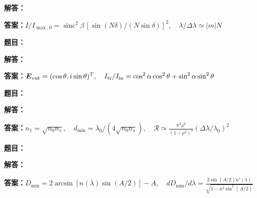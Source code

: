 \documentclass[lang=cn,color=blue,11pt]{elegantbook}
\begin{document}
\par\noindent\textbf{解答：}
\par\noindent\textbf{答案：}\(\displaystyle I/I_{\max,0}=\operatorname{sinc}^2\beta\,[\sin(N\delta)/(N\sin\delta)]^2,\quad \lambda/\Delta\lambda\simeq |m|N\)\par
\par\smallskip\noindent\hrulefill\par\medskip
{}\par
\noindent\textbf{题目：}
\par\noindent\textbf{解答：}
\par\noindent\textbf{答案：}\(\displaystyle \boldsymbol E_{\rm out}=(\cos\theta,i\sin\theta)^T,\quad I_{\rm tr}/I_{\rm in}=\cos^2\alpha\cos^2\theta+\sin^2\alpha\sin^2\theta\)\par
\par\smallskip\noindent\hrulefill\par\medskip
{}\par
\noindent\textbf{题目：}
\par\noindent\textbf{解答：}
\par\noindent\textbf{答案：}\(\displaystyle n_1=\sqrt{n_0n_s},\quad d_{\min}=\lambda_0/(4\sqrt{n_0n_s}),\quad\mathcal R\simeq\frac{\pi^2\rho^2}{(1-\rho^2)^2}(\Delta\lambda/\lambda_0)^2\)\par
\par\smallskip\noindent\hrulefill\par\medskip
{}\par
\noindent\textbf{题目：}
\par\noindent\textbf{解答：}
\par\noindent\textbf{答案：}\(\displaystyle D_{\min}=2\arcsin[n(\lambda)\sin(A/2)]-A,\quad dD_{\min}/d\lambda=\frac{2\sin(A/2)n'(\lambda)}{\sqrt{1-n^2\sin^2(A/2)}}\)\par
\par\smallskip\noindent\hrulefill\par\medskip
{}\par
\end{document}
